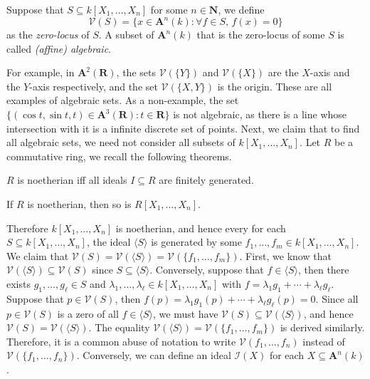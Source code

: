 \documentclass[11pt]{book}
\begin{document}
\begin{definition}
Suppose that $S\subseteq k[X_1,\dots,X_n]$ for some $n\in\mathbf N$, we define
\[\mathcal{V}(S)=\{x\in \mathbf A^n(k):\forall f\in S,\,f(x)=0\}\]
as the \textit{zero-locus} of $S$. A subset of $\mathbf A^n(k)$ that is the zero-locus of some $S$ is called \textit{(affine) algebraic}.
\end{definition}
For example, in $\mathbf{A}^2(\mathbf R)$, the sets $\mathcal{V}(\{Y\})$ and $\mathcal{V}(\{X\})$ are the $X$-axis and the $Y$-axis respectively, and the set $\mathcal{V}(\{X,Y\})$ is the origin. These are all examples of algebraic sets. As a non-example, the set $\{(\cos t,\sin t,t)\in\mathbf A^3(\mathbf R):t\in\mathbf R\}$ is not algebraic, as there is a line whose intersection with it is a infinite discrete set of points. Next, we claim that to find all algebraic sets, we need not consider all subsets of $k[X_1,\dots,X_n]$. Let $R$ be a commutative ring, we recall the following theorems.
\begin{theorem}$R$ is noetherian iff all ideals $I\subseteq R$ are finitely generated.
\end{theorem}
\begin{theorem}If $R$ is noetherian, then so is $R[X_1,\dots,X_n]$.
\end{theorem}

Therefore $k[X_1,\dots,X_n]$ is noetherian, and hence every for each $S\subseteq k[X_1,\dots,X_n]$, the ideal $\langle S\rangle$ is generated by some $f_1,\dots,f_m\in k[X_1,\dots,X_n]$. We claim that $\mathcal{V}(S)=\mathcal{V}(\langle S\rangle)=\mathcal{V}(\{f_1,\dots,f_m\})$. First, we know that $\mathcal{V}(\langle S\rangle)\subseteq \mathcal{V}(S)$ since $S\subseteq\langle S\rangle$. Conversely, suppose that $f\in\langle S\rangle$, then there exists $g_1,\dots,g_\ell\in S$ and $\lambda_1,\dots,\lambda_\ell\in k[X_1,\dots,X_n]$ with $f=\lambda_1g_1+\cdots+\lambda_{\ell}g_{\ell}$. Suppose that $p\in \mathcal{V}(S)$, then $f(p)=\lambda_1g_1(p)+\cdots+\lambda_{\ell}g_{\ell}(p)=0$. Since all $p\in \mathcal{V}(S)$ is a zero of all $f\in \langle S\rangle$, we must have $\mathcal{V}(S)\subseteq \mathcal{V}(\langle S\rangle)$, and hence $\mathcal{V}(S)=\mathcal{V}(\langle S\rangle)$. The equality $\mathcal{V}(\langle S\rangle)=\mathcal{V}(\{f_1,\dots,f_m\})$ is derived similarly. Therefore, it is a common abuse of notation to write $\mathcal{V}(f_1,\dots,f_n)$ instead of $\mathcal{V}(\{f_1,\dots,f_n\})$. Conversely, we can define an ideal $\mathcal{I}(X)$ for each $X\subseteq \mathbf A^n(k)$. 
\end{document}
